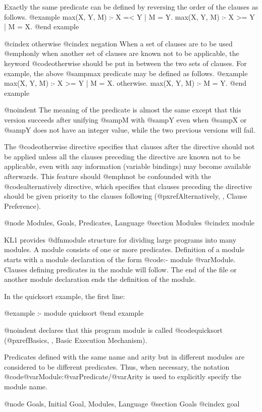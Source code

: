 Exactly the same predicate can be defined by reversing the order of the
clauses as follows.
@example
max(X, Y, M) :- X =< Y | M = Y.
max(X, Y, M) :- X >= Y | M = X.
@end example

@cindex otherwise
@cindex negation
When a set of clauses are to be used @emph{only when} another set of
clauses are known not to be applicable, the keyword @code{otherwise}
should be put in between the two sets of clauses.  For example, the
above @samp{max} predicate may be defined as follows.
@example
max(X, Y, M) :- X >= Y | M = X.
otherwise.
max(X, Y, M) :- M = Y.
@end example

@noindent
The meaning of the predicate is almost the same except that this version
succeeds after unifying @samp{M} with @samp{Y} even when @samp{X} or
@samp{Y} does not have an integer value, while the two previous versions
will fail.

The @code{otherwise} directive specifies that clauses after the
directive should not be applied unless all the clauses preceding the
directive are known not to be applicable, even with any information
(variable bindings) may become available afterwards.  This feature
should @emph{not} be confounded with the @code{alternatively} directive,
which specifies that clauses preceding the directive should be given
priority to the clauses following (@pxref{Alternatively, , Clause
Preference}).

@node Modules, Goals, Predicates, Language
@section Modules
@cindex module

KL1 provides @dfn{module} structure for dividing large programs into
many modules.  A module consists of one or more predicates.  Definition
of a module starts with a module declaration of the form @code{:- module
@var{Module}.} Clauses defining predicates in the module will follow.
The end of the file or another module declaration ends the definition of
the module.

In the quicksort example, the first line:

@example
:- module quicksort
@end example

@noindent
declares that this program module is called @code{quicksort}
(@pxref{Basics, , Basic Execution Mechanism}).

Predicates defined with the same name and arity but in different modules
are considered to be different predicates.  Thus, when necessary, the
notation @code{@var{Module}:@var{Predicate}/@var{Arity}} is used to
explicitly specify the module name.

@node Goals, Initial Goal, Modules, Language
@section Goals
@cindex goal

